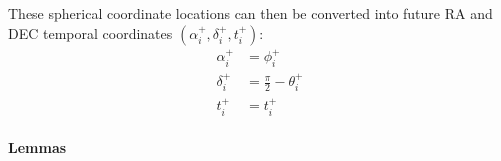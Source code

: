 \documentclass[letterpaper,11pt,english]{sphinxmanual}
\begin{document}
\sphinxAtStartPar
These spherical coordinate locations can then be converted into future RA and
DEC temporal coordinates \((\alpha^+_i, \delta^+_i, t^+_i)\):
\begin{equation*}
\begin{split}\alpha^+_i &= \phi^+_i \\
\delta^+_i &= \frac{\pi}{2} - \theta^+_i \\
t^+_i &= t^+_i\end{split}
\end{equation*}

\paragraph{Lemmas}
\label{\detokenize{technical/algorithms/spherical_kinematics:lemmas}}
\end{document}
